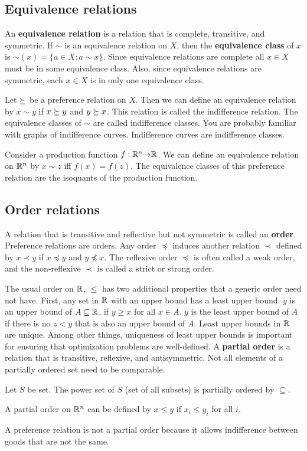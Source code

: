 \subsection{Equivalence relations}
An \textbf{equivalence relation} is a relation that is complete,
transitive, and symmetric. If $\sim$ is an equivalence relation on
$X$, then the \textbf{equivalence class} of $x$ is $\sim(x) = \{ a
\in X: a \sim x \}$. Since equivalence relations are complete all $x
\in X$ must be in some equivalence class. Also, since equivalence
relations are symmetric, each $x \in X$ is in only one equivalence
class. 
\begin{example}[Indifference]
  Let $\succeq$ be a preference relation on $X$. Then we can define an
  equivalence relation by $x \sim y$ if $x \succeq y$ and $y \succeq
  x$. This relation is called the indifference relation. The
  equivalence classes of $\sim$ are called indifference classes. You
  are probably familiar with graphs of indifference
  curves. Indifference curves are indifference classes. 
\end{example}
\begin{example}[Isoquants]
  Consider a production function $f: \mathbb{R}^n {\rightarrow} \mathbb{R}$. We can define an
  equivalence relation on $\mathbb{R}^n$ by $x \sim z$ iff $f(x) = f(z)$. The
  equivalence classes of this preference relation are the isoquants of
  the production function. 
\end{example}

\subsection{Order relations}
A relation that is transitive and reflective but not symmetric is
called an \textbf{order}. Preference relations are orders. Any order
$\preceq$ induces another relation $\prec$ defined by $x \prec y$ if
$x \preceq y$ and $y \npreceq x$. The reflexive order $\preceq$ is
often called a weak order, and the non-reflexive $\prec$ is called a
strict or strong order.  

The usual order on $\mathbb{R}$, $\leq$ has two additional properties that a
generic order need not have. First, any set in $\mathbb{R}$ with an upper
bound has a least upper bound. $y$ is an upper bound of $ A \subseteq
\mathbb{R}$, if $y \geq x$ for all $x \in A$. $y$ is the least upper bound of
$A$ if there is no $z < y$ that is also an upper bound of $A$. Least
upper bounds in $\mathbb{R}$ are unique. Among other things, uniqueness of
least upper bounds is important for ensuring that optimization
problems are well-defined. A \textbf{partial order} is a relation that
is transitive, reflexive, and antisymmetric. Not all elements of a
partially ordered set need to be comparable.  
\begin{example}
  Let $S$ be set. The power set of $S$ (set of all subsets) is
  partially ordered by $\subseteq$.
\end{example}
\begin{example}
  A partial order on $\mathbb{R}^n$ can be defined by $x \leq y$ if $x_i \leq
  y_i$ for all $i$.
\end{example}
A preference relation is not a partial order because it allows
indifference between goods that are not the same. 

